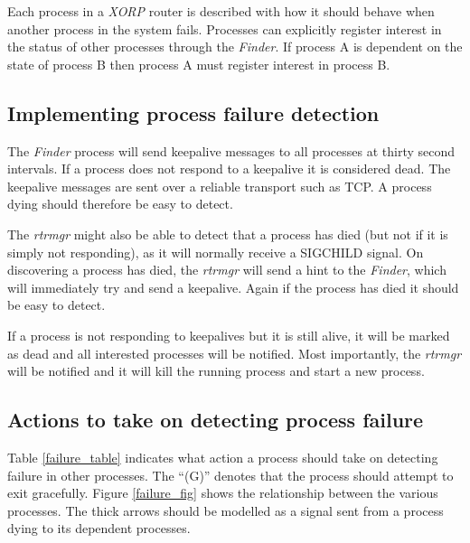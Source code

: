 \documentclass[11pt]{article}
\makeatletter
\newcommand{\xorp} {{\em XORP}\@\xspace}
\newcommand{\finder} {{\em Finder}\@\xspace}
\newcommand{\rtrmgr} {{\em rtrmgr}\@\xspace}
\makeatother
\begin{document}
Each process in a \xorp router is described with how it should behave
when another process in the system fails. Processes can explicitly
register interest in the status of other processes through the
\finder. If process A is dependent on the state of process B then
process A must register interest in process B.

\subsection{Implementing process failure detection}

The \finder process will send keepalive messages to all processes at
thirty second intervals. If a process does not respond to a keepalive
it is considered dead. The keepalive messages are sent over a reliable
transport such as TCP. A process dying should therefore be easy to
detect.

The \rtrmgr might also be able to detect that a process has died (but
not if it is simply not responding), as it will normally receive a
SIGCHILD signal.  On discovering a process has died, the \rtrmgr will
send a hint to the \finder, which will immediately try and send a
keepalive.  Again if the process has died it should be easy to detect.

If a process is not responding to keepalives but it is still alive, it
will be marked as dead and all interested processes will be notified.
Most importantly, the \rtrmgr will be notified and it will kill the
running process and start a new process.

\subsection{Actions to take on detecting process failure}

Table \ref{failure_table} indicates what action a process should take
on detecting failure in other processes. The ``(G)'' denotes that the
process should attempt to exit gracefully. Figure \ref{failure_fig}
shows the relationship between the various processes. The thick arrows
should be modelled as a signal sent from a process dying to its
dependent processes.
\end{document}
